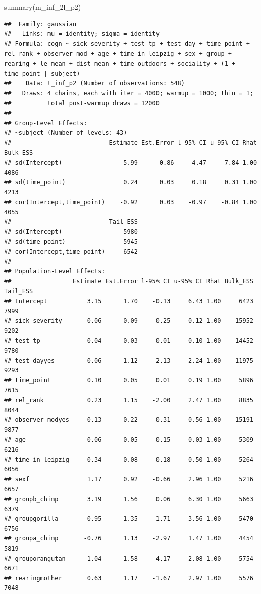 \documentclass[
]{article}
\newenvironment{Shaded}{\begin{snugshade}}{\end{snugshade}}
\newcommand{\FunctionTok}[1]{\textcolor[rgb]{0.00,0.00,0.00}{#1}}
\newcommand{\NormalTok}[1]{#1}
\begin{document}
\begin{Shaded}
\begin{Highlighting}[]
\FunctionTok{summary}\NormalTok{(m\_inf\_2l\_p2)}
\end{Highlighting}
\end{Shaded}

\begin{verbatim}
##  Family: gaussian 
##   Links: mu = identity; sigma = identity 
## Formula: cogn ~ sick_severity + test_tp + test_day + time_point + rel_rank + observer_mod + age + time_in_leipzig + sex + group + rearing + le_mean + dist_mean + time_outdoors + sociality + (1 + time_point | subject) 
##    Data: t_inf_p2 (Number of observations: 548) 
##   Draws: 4 chains, each with iter = 4000; warmup = 1000; thin = 1;
##          total post-warmup draws = 12000
## 
## Group-Level Effects: 
## ~subject (Number of levels: 43) 
##                           Estimate Est.Error l-95% CI u-95% CI Rhat Bulk_ESS
## sd(Intercept)                 5.99      0.86     4.47     7.84 1.00     4086
## sd(time_point)                0.24      0.03     0.18     0.31 1.00     4213
## cor(Intercept,time_point)    -0.92      0.03    -0.97    -0.84 1.00     4055
##                           Tail_ESS
## sd(Intercept)                 5980
## sd(time_point)                5945
## cor(Intercept,time_point)     6542
## 
## Population-Level Effects: 
##                 Estimate Est.Error l-95% CI u-95% CI Rhat Bulk_ESS Tail_ESS
## Intercept           3.15      1.70    -0.13     6.43 1.00     6423     7999
## sick_severity      -0.06      0.09    -0.25     0.12 1.00    15952     9202
## test_tp             0.04      0.03    -0.01     0.10 1.00    14452     9780
## test_dayyes         0.06      1.12    -2.13     2.24 1.00    11975     9293
## time_point          0.10      0.05     0.01     0.19 1.00     5896     7615
## rel_rank            0.23      1.15    -2.00     2.47 1.00     8835     8044
## observer_modyes     0.13      0.22    -0.31     0.56 1.00    15191     9877
## age                -0.06      0.05    -0.15     0.03 1.00     5309     6216
## time_in_leipzig     0.34      0.08     0.18     0.50 1.00     5264     6056
## sexf                1.17      0.92    -0.66     2.96 1.00     5216     6657
## groupb_chimp        3.19      1.56     0.06     6.30 1.00     5663     6379
## groupgorilla        0.95      1.35    -1.71     3.56 1.00     5470     6756
## groupa_chimp       -0.76      1.13    -2.97     1.47 1.00     4454     5819
## grouporangutan     -1.04      1.58    -4.17     2.08 1.00     5754     6671
## rearingmother       0.63      1.17    -1.67     2.97 1.00     5576     7048

\end{verbatim}
\end{document}
